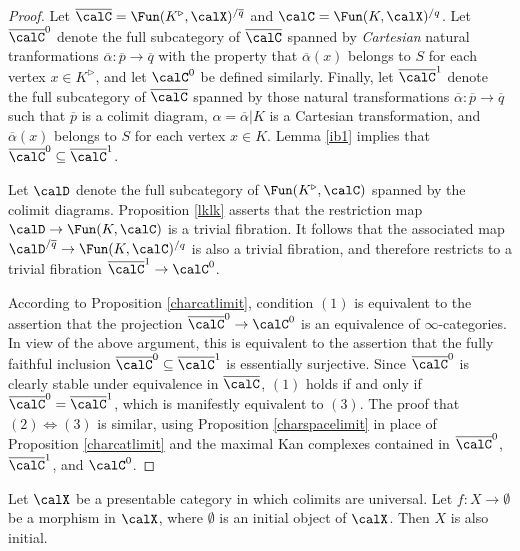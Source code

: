 \begin{proof}
Let $\overline{\calC} = \Fun(K^{\triangleright}, \calX)^{/\overline{q}}$ and
$\calC = \Fun(K,\calX)^{/q}$. Let $\overline{\calC}^{0}$ denote the full subcategory of
$\overline{\calC}$ spanned by {\em Cartesian} natural tranformations $\overline{\alpha}: \overline{p} \rightarrow \overline{q}$ with the property that
$\overline{\alpha}(x)$ belongs to $S$ for each vertex $x \in K^{\triangleright}$, and let $\calC^0$ be defined similarly. Finally, let
$\overline{\calC}^{1}$ denote the full subcategory of $\overline{\calC}$ spanned by those natural transformations $\overline{\alpha}: \overline{p} \rightarrow \overline{q}$ such that $\overline{p}$ is a colimit diagram, $\alpha = \overline{\alpha} | K$ is a Cartesian transformation, and
$\overline{\alpha}(x)$ belongs to $S$ for each vertex $x \in K$. Lemma \ref{ib1} implies that $\overline{\calC}^{0} \subseteq \overline{\calC}^{1}$. 

Let $\calD$ denote the full subcategory of $\Fun(K^{\triangleright}, \calC)$ spanned by the colimit diagrams. Proposition \ref{lklk} asserts that the restriction map $\calD \rightarrow \Fun(K,\calC)$ is a trivial fibration. It follows that the associated map $\calD^{/\overline{q}} \rightarrow \Fun(K,\calC)^{/q}$ is also a trivial fibration, and therefore restricts to a trivial fibration
$\overline{\calC}^{1} \rightarrow \calC^{0}$.

According to Proposition \ref{charcatlimit}, condition $(1)$ is equivalent to the assertion that
the projection $\overline{\calC}^{0} \rightarrow \calC^0$ is an equivalence of $\infty$-categories.
In view of the above argument, this is equivalent to the assertion that the fully faithful inclusion
$\overline{\calC}^{0} \subseteq \overline{\calC}^{1}$ is essentially surjective. Since
$\overline{\calC}^{0}$ is clearly stable under equivalence in $\overline{\calC}$, $(1)$
holds if and only if $\overline{\calC}^0 = \overline{\calC}^1$, which is manifestly equivalent to $(3)$.
The proof that $(2) \Leftrightarrow (3)$ is similar, using Proposition \ref{charspacelimit} in place
of Proposition \ref{charcatlimit} and the maximal Kan complexes contained in
$\overline{\calC}^{0}$, $\overline{\calC}^{1}$, and $\calC^0$.
\end{proof}

\begin{lemma}\label{sumoto}
Let $\calX$ be a presentable category in which colimits are universal.
Let $f: X \rightarrow \emptyset$ be a morphism in $\calX$, where $\emptyset$ is an initial
object of $\calX$. Then $X$ is also initial.
\end{lemma}

